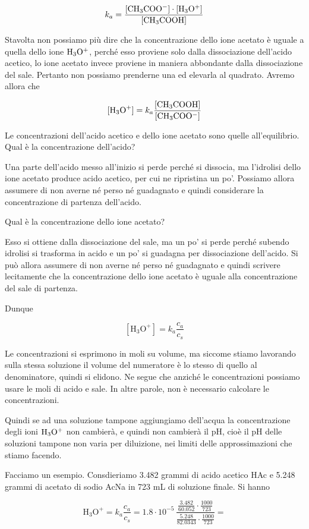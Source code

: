 $$k_a = \rm{\frac{[CH_3COO^-] \cdot [H_3O^+]}{[CH_3COOH]}}$$

Stavolta non possiamo più dire che la concentrazione dello ione acetato è uguale a quella dello ione $\rm H_3O^+$, perché esso proviene solo dalla dissociazione dell'acido acetico, lo ione acetato invece proviene in maniera abbondante dalla dissociazione del sale. Pertanto non possiamo prenderne una ed elevarla al quadrato. Avremo allora che

$$[\text{H}_3\text{O}^+] = k_a \rm{\frac{[CH_3COOH]}{[CH_3COO^-]}}$$

Le concentrazioni dell'acido acetico e dello ione acetato sono quelle all'equilibrio. Qual è la concentrazione dell'acido?

Una parte dell'acido messo all'inizio si perde perché si dissocia, ma l'idrolisi dello ione acetato produce acido acetico, per cui ne ripristina un po'. Possiamo allora assumere di non averne né perso né guadagnato e quindi considerare la concentrazione di partenza dell'acido.

Qual è la concentrazione dello ione acetato?

Esso si ottiene dalla dissociazione del sale, ma un po' si perde perché subendo idrolisi si trasforma in acido e un po' si guadagna per dissociazione dell'acido. Si può allora assumere di non averne né perso né guadagnato e quindi scrivere lecitamente che la concentrazione dello ione acetato è uguale alla concentrazione del sale di partenza.

Dunque

$$[\text{H}_3\text{O}^+] = k_a \frac{c_a}{c_s}$$

Le concentrazioni si esprimono in moli su volume, ma siccome stiamo lavorando sulla stessa soluzione il volume del numeratore è lo stesso di quello al denominatore, quindi si elidono. Ne segue che anziché le concentrazioni possiamo usare le moli di acido e sale. In altre parole, non è necessario calcolare le concentrazioni.

Quindi se ad una soluzione tampone aggiungiamo dell'acqua la concentrazione degli ioni $\rm H_3O^+$ non cambierà, e quindi non cambierà il pH, cioè il pH delle soluzioni tampone non varia per diluizione, nei limiti delle approssimazioni che stiamo facendo.

\vspace{0.2cm}Facciamo un esempio. Consdieriamo 3.482 grammi di acido acetico HAc e 5.248 grammi di acetato di sodio AcNa in 723 mL di soluzione finale. Si hanno

$$\text{H}_3\text{O}^+=k_a\frac{c_a}{c_s}
=1.8 \cdot 10^{-5}\,\frac{\frac{3.482}{60.052} \cdot \frac{1000}{723}}{\frac{5.248}{82.0343} \cdot \frac{1000}{723}}=$$

